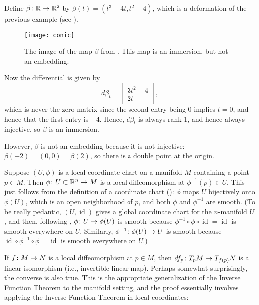 \begin{example}\label{ex:conic}
	Define $\beta \colon\thinspace\! \mathbb{R} \to \mathbb{R}^2$ by $\beta(t) = (t^3 - 4t, t^2 - 4)$, which is a deformation of the previous example (see ).
	
	\begin{figure}[htbp]
		\centering
			\texttt{[image: conic]}
		\caption{The image of the map $\beta$ from . This map is an immersion, but not an embedding.}
		\label{fig:conic}
	\end{figure}
	
	Now the differential is given by
	\[
		d\beta_t = \begin{bmatrix} 3t^2 - 4 \\ 2t \end{bmatrix},
	\]
	which is never the zero matrix since the second entry being 0 implies $t=0$, and hence that the first entry is $-4$. Hence, $d\beta_t$ is always rank 1, and hence always injective, so $\beta$ is an immersion.
	
	However, $\beta$ is not an embedding because it is not injective: $\beta(-2) = (0,0) = \beta(2)$, so there is a double point at the origin.
\end{example}

\begin{example}\label{ex:coordinate charts are local diffeomorphisms}
	Suppose $(U,\phi)$ is a local coordinate chart on a manifold $M$ containing a point $p \in M$. Then $\phi \colon\thinspace\! U \subset \mathbb{R}^n \to M$ is a local diffeomorphism at $\phi^{-1}(p) \in U$. This just follows from the definition of a coordinate chart (): $\phi$ maps $U$ bijectively onto $\phi(U)$, which is an open neighborhood of $p$, and both $\phi$ and $\phi^{-1}$ are smooth. (To be really pedantic, $(U, \operatorname{id})$ gives a global coordinate chart for the $n$-manifold $U$, and then, following , $\phi \colon\thinspace\! U \to \phi(U)$ is smooth because $\phi^{-1} \circ \phi \circ \operatorname{id} = \operatorname{id}$ is smooth everywhere on $U$. Similarly, $\phi^{-1} \colon\thinspace\! \phi(U) \to U$ is smooth because $\operatorname{id} \circ \phi^{-1} \circ \phi = \operatorname{id}$ is smooth everywhere on $U$.)
\end{example}

If $f \colon\thinspace\! M \to N$ is a local diffeomorphism at $p \in M$, then $df_p \colon\thinspace\! T_pM \to T_{f(p)}N$ is a linear isomorphism (i.e., invertible linear map). Perhaps somewhat surprisingly, the converse is also true. This is the appropriate generalization of the Inverse Function Theorem to the manifold setting, and the proof essentially involves applying the Inverse Function Theorem in local coordinates:


